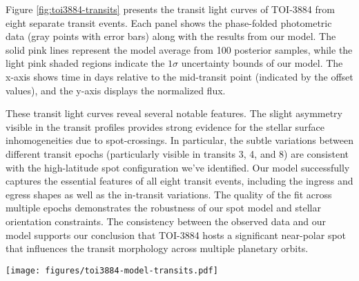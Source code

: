 \documentclass[twocolumn]{aastex631}
\begin{document}
%
Figure \ref{fig:toi3884-transits} presents the transit light curves of TOI-3884 from eight separate transit events. 
Each panel shows the phase-folded photometric data (gray points with error bars) along with the results from our model. 
The solid pink lines represent the model average from 100 posterior samples, while the light pink shaded regions indicate the 
$1\sigma$ uncertainty bounds of our model. The x-axis shows time in days relative to the mid-transit point 
(indicated by the offset values), and the y-axis displays the normalized flux.

These transit light curves reveal several notable features. The slight asymmetry visible in the transit profiles provides strong 
evidence for the stellar surface inhomogeneities due to spot-crossings. In particular, the subtle variations between different 
transit epochs (particularly visible in transits 3, 4, and 8) are consistent with the high-latitude spot configuration we've 
identified. Our model successfully captures the essential features of all eight transit events, including the ingress and egress 
shapes as well as the in-transit variations. The quality of the fit across multiple epochs demonstrates the robustness of 
our spot model and stellar orientation constraints. The consistency between the observed data and our model supports our conclusion 
that TOI-3884 hosts a significant near-polar spot that influences the transit morphology across multiple planetary orbits.

%
\begin{figure*}[hbt!]
    \centering
    \texttt{[image: figures/toi3884-model-transits.pdf]}
    \caption{Light curves for eight transit events of TOI-3884b. Each panel shows the observed photometric data from TESS (gray points 
    with error bars) and the results of our MCMC modeling. The solid pink lines represent the model average from 100 posterior 
    samples, while the light pink shaded regions indicate the 1$\sigma$ uncertainty bounds. The x-axis displays time in days 
    relative to the mid-transit point (shown as offsets at the bottom of each panel), and the y-axis shows the normalized flux. 
    The slight asymmetries and variations between transit epochs are consistent with the influence of a high-latitude stellar spot. 
    Our model successfully reproduces the observed transit profiles across all epochs, supporting our inferred spot and stellar 
    orientation parameters.}
    \label{fig:toi3884-transits}
\end{figure*}
%
\end{document}
